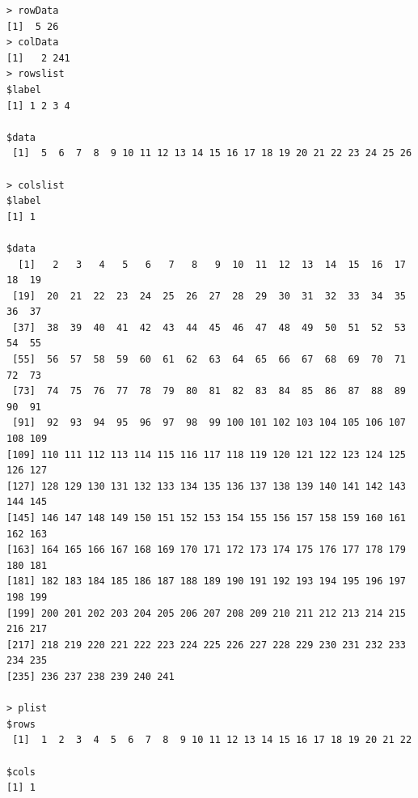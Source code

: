 \documentclass[a4paper]{article}
\begin{document}
\begin{verbatim}
> rowData 
[1]  5 26
> colData 
[1]   2 241
> rowslist 
$label
[1] 1 2 3 4

$data
 [1]  5  6  7  8  9 10 11 12 13 14 15 16 17 18 19 20 21 22 23 24 25 26

> colslist 
$label
[1] 1

$data
  [1]   2   3   4   5   6   7   8   9  10  11  12  13  14  15  16  17  18  19
 [19]  20  21  22  23  24  25  26  27  28  29  30  31  32  33  34  35  36  37
 [37]  38  39  40  41  42  43  44  45  46  47  48  49  50  51  52  53  54  55
 [55]  56  57  58  59  60  61  62  63  64  65  66  67  68  69  70  71  72  73
 [73]  74  75  76  77  78  79  80  81  82  83  84  85  86  87  88  89  90  91
 [91]  92  93  94  95  96  97  98  99 100 101 102 103 104 105 106 107 108 109
[109] 110 111 112 113 114 115 116 117 118 119 120 121 122 123 124 125 126 127
[127] 128 129 130 131 132 133 134 135 136 137 138 139 140 141 142 143 144 145
[145] 146 147 148 149 150 151 152 153 154 155 156 157 158 159 160 161 162 163
[163] 164 165 166 167 168 169 170 171 172 173 174 175 176 177 178 179 180 181
[181] 182 183 184 185 186 187 188 189 190 191 192 193 194 195 196 197 198 199
[199] 200 201 202 203 204 205 206 207 208 209 210 211 212 213 214 215 216 217
[217] 218 219 220 221 222 223 224 225 226 227 228 229 230 231 232 233 234 235
[235] 236 237 238 239 240 241

> plist 
$rows
 [1]  1  2  3  4  5  6  7  8  9 10 11 12 13 14 15 16 17 18 19 20 21 22

$cols
[1] 1


\end{verbatim}
\end{document}

